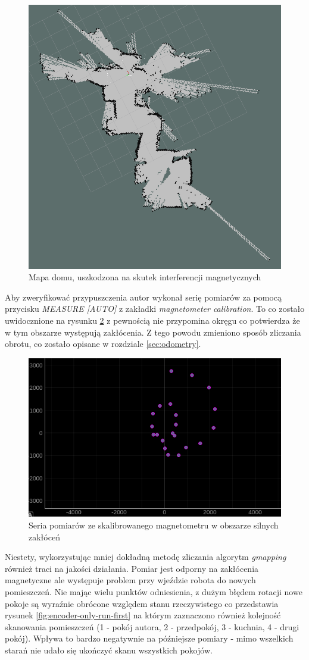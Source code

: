 \begin{figure}[ht]
	\centering
	    \includegraphics[width=0.6\linewidth]{rys/2020-11-04-170347_1920x1080_scrot.PNG}
	\caption{Mapa domu, uszkodzona na skutek interferencji magnetycznych}
	\label{fig:mag-interference-first}
\end{figure}

Aby zweryfikować przypuszczenia autor wykonał serię pomiarów za pomocą przycisku \emph{MEASURE [AUTO]} z zakładki \emph{magnetometer calibration}. To co zostało uwidocznione na rysunku \ref{fig:mag-interference-graph} z pewnością nie przypomina okręgu co potwierdza że w tym obszarze występują zakłócenia. Z tego powodu zmieniono sposób zliczania obrotu, co zostało opisane w rozdziale \ref{sec:odometry}.

\begin{figure}[ht]
	\centering
		\includegraphics[width=0.6\linewidth]{rys/calibrated-mag-high-interference-broken-rotation.PNG}
	\caption{Seria pomiarów ze skalibrowanego magnetometru w obszarze silnych zakłóceń}
	\label{fig:mag-interference-graph}
\end{figure}

Niestety, wykorzystując mniej dokładną metodę zliczania algorytm \emph{gmapping} również traci na jakości działania. Pomiar jest odporny na zakłócenia magnetyczne ale występuje problem przy wjeździe robota do nowych pomieszczeń. Nie mając wielu punktów odniesienia, z dużym błędem rotacji nowe pokoje są wyraźnie obrócone względem stanu rzeczywistego co przedstawia rysunek \ref{fig:encoder-only-run-first} na którym zaznaczono również kolejność skanowania pomieszczeń (1 - pokój autora, 2 - przedpokój, 3 - kuchnia, 4 - drugi pokój). Wpływa to bardzo negatywnie na późniejsze pomiary - mimo wszelkich starań nie udało się ukończyć skanu wszystkich pokojów.
\\

